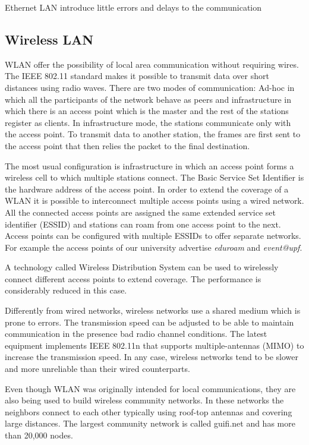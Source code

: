 Ethernet LAN introduce little errors and delays to the communication

\subsection{Wireless LAN}

WLAN offer the possibility of local area communication without requiring wires.
The IEEE 802.11 standard makes it possible to transmit data over short distances using radio waves.
There are two modes of communication: Ad-hoc in which all the participants of the network behave as peers and infrastructure in which there is an access point which is the master and the rest of the stations register as clients.
In infrastructure mode, the stations communicate only with the access point.
To transmit data to another station, the frames are first sent to the access point that then relies the packet to the final destination.

The most usual configuration is infrastructure in which an access point forms a wireless cell to which multiple stations connect.
The Basic Service Set Identifier is the hardware address of the access point.
In order to extend the coverage of a WLAN it is possible to interconnect multiple access points using a wired network.
All the connected access points are assigned the same extended service set identifier (ESSID) and stations can roam from one access point to the next.
Access points can be configured with multiple ESSIDs to offer separate networks.
For example the access points of our university advertise \emph{eduroam} and \emph{event@upf}.

A technology called Wireless Distribution System can be used to wirelessly connect different access points to extend coverage.
The performance is considerably reduced in this case.

Differently from wired networks, wireless networks use a shared medium which is prone to errors.
The transmission speed can be adjusted to be able to maintain communication in the presence bad radio channel conditions.
The latest equipment implements IEEE 802.11n that supports multiple-antennas (MIMO) to increase the transmission speed.
In any case, wireless networks tend to be slower and more unreliable than their wired counterparts.

Even though WLAN was originally intended for local communications, they are also being used to build wireless community networks.
In these networks the neighbors connect to each other typically using roof-top antennas and covering large distances.
The largest community network is called guifi.net and has more than 20,000 nodes.

